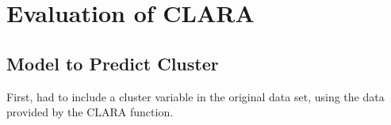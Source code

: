 \documentclass[12pt,twoside]{amherstthesis}
\begin{document}
  \begin{Shaded}
  \begin{Highlighting}[]
  \end{Highlighting}
  \end{Shaded}
  
  \begin{Shaded}
  \begin{Highlighting}[]
  \OperatorTok{$}
  \OperatorTok{$} \OperatorTok{:}\NormalTok{, } \NormalTok{)}
  \end{Highlighting}
  \end{Shaded}
  
  \begin{Shaded}
  \begin{Highlighting}[]
  \OperatorTok{::}
  \end{Highlighting}
  \end{Shaded}
  
  \section{Evaluation of CLARA}\label{evaluation-of-clara}
  
  \subsection{Model to Predict Cluster}\label{model-to-predict-cluster}
  
  First, had to include a cluster variable in the original data set, using
  the data provided by the CLARA function.
  
  \begin{Shaded}
  \begin{Highlighting}[]
  \StringTok{ }\OperatorTok{$}
  \StringTok{ }
  \end{Highlighting}
  \end{Shaded}
  
\end{document}
